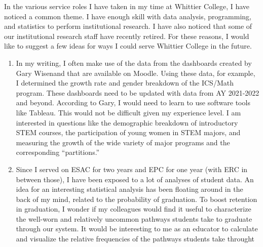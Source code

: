\documentclass[../../../main.tex]{subfiles}
\begin{document}
In the various service roles I have taken in my time at Whittier College, I have noticed a common theme.  I have enough skill with data analysis, programming, and statistics to perform institutional research.  I have also noticed that some of our institutional research staff have recently retired.  For these reasons, I would like to suggest a few ideas for ways I could serve Whittier College in the future.
\begin{enumerate}
\item In my writing, I often make use of the data from the dashboards created by Gary Wisenand that are available on Moodle.  Using these data, for example, I determined the growth rate and gender breakdown of the ICS/Math program.  These dashboards need to be updated with data from AY 2021-2022 and beyond.  According to Gary, I would need to learn to use software tools like Tableau.  This would not be difficult given my experience level.  I am interested in questions like the demographic breakdown of introductory STEM courses, the participation of young women in STEM majors, and measuring the growth of the wide variety of major programs and the corresponding ``partitions.''
\item Since I served on ESAC for two years and EPC for one year (with ERC in between those), I have been exposed to a lot of analyses of student data.  An idea for an interesting statistical analysis has been floating around in the back of my mind, related to the probability of graduation.  To boost retention in graduation, I wonder if my colleagues would find it useful to characterize the well-worn and relatively uncommon pathways students take to graduate through our system.  It would be interesting to me as an educator to calculate and visualize the relative frequencies of the pathways students take throught 
\end{enumerate}
\end{document}
